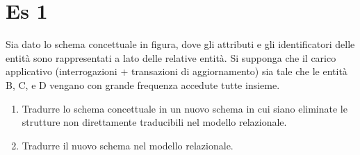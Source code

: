 \newpage
\section{Es 1}
Sia dato lo schema concettuale in figura, dove gli attributi e gli identificatori delle entità sono rappresentati a lato delle relative entità. Si supponga che il carico applicativo (interrogazioni + transazioni di aggiornamento) sia tale che le entità B, C, e D vengano con grande frequenza accedute tutte insieme.
\begin{enumerate}
    \item Tradurre lo schema concettuale in un nuovo schema in cui siano eliminate le strutture non direttamente traducibili nel modello relazionale.
    \item Tradurre il nuovo schema nel modello relazionale.
\end{enumerate}

\vspace{1.5cm}

